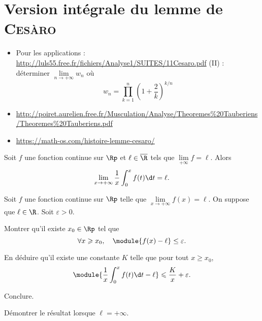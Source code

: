 \section{Version intégrale du lemme de \textsc{Cesàro}}



\begin{itemize}
    \item Pour les applications : \url{http://luls55.free.fr/fichiers/Analyse1/SUITES/11Cesaro.pdf} (II) : déterminer $\lim\limits_{n \to +\infty} w_n$ où $$w_n = \prod_{k=1}^n \left(1 + \frac{2}{k}\right)^{k/n}$$
    \item \url{http://poiret.aurelien.free.fr/Musculation/Analyse/Theoremes%20Tauberiens/Theoremes%20Tauberiens.pdf}
    \item \url{https://math-os.com/histoire-lemme-cesaro/}
\end{itemize}


\begin{theo}
Soit $f$ une fonction continue sur $\Rp$ et $\ell \in \overline{\R}$ tels que $\lim\limits_{+\infty} f = \ell$. Alors 
\[
\lim_{x \to + \infty} \frac{1}{x} \int_0^x f(t) \d t = \ell.
\]
\end{theo}

\begin{exercice}
Soit $f$ une fonction continue sur $\Rp$ telle que $\lim\limits_{x\to+\infty} f(x) = \ell$. On suppose que $\ell \in \R$. Soit $\varepsilon > 0$.
\begin{questions}
\item Montrer qu'il existe $x_0 \in \Rp$ tel que
\[
\forall x \geqslant x_0,\quad \module{f(x) - \ell} \leq \varepsilon.
\]

\item En déduire qu'il existe une constante $K$ telle que pour tout $x \geqslant x_0$,
\[
\module{\frac{1}{x} \int_0^x f(t) \d t - \ell} \leqslant \frac{K}{x} + \varepsilon.
\]

\item Conclure.

\item Démontrer le résultat lorsque $\ell = +\infty$.
\end{questions}
\end{exercice}

